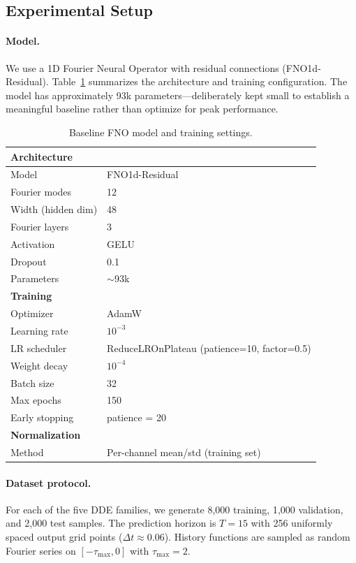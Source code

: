 
\subsection{Experimental Setup}

\paragraph{Model.}
We use a 1D Fourier Neural Operator with residual connections (FNO1d-Residual).
Table~\ref{tab:model-settings} summarizes the architecture and training configuration.
The model has approximately 93k parameters---deliberately kept small to establish a
meaningful baseline rather than optimize for peak performance.

\begin{table}[h]
\centering
\caption{Baseline FNO model and training settings.}
\label{tab:model-settings}
\begin{tabular}{ll}
\toprule
\textbf{Architecture} & \\
\midrule
Model & FNO1d-Residual \\
Fourier modes & 12 \\
Width (hidden dim) & 48 \\
Fourier layers & 3 \\
Activation & GELU \\
Dropout & 0.1 \\
Parameters & ${\sim}$93k \\
\midrule
\textbf{Training} & \\
\midrule
Optimizer & AdamW \\
Learning rate & $10^{-3}$ \\
LR scheduler & ReduceLROnPlateau (patience=10, factor=0.5) \\
Weight decay & $10^{-4}$ \\
Batch size & 32 \\
Max epochs & 150 \\
Early stopping & patience = 20 \\
\midrule
\textbf{Normalization} & \\
\midrule
Method & Per-channel mean/std (training set) \\
\bottomrule
\end{tabular}
\end{table}

\paragraph{Dataset protocol.}
For each of the five DDE families, we generate 8{,}000 training, 1{,}000 validation,
and 2{,}000 test samples.  The prediction horizon is $T = 15$ with 256 uniformly spaced
output grid points ($\Delta t \approx 0.06$).  History functions are sampled as random
Fourier series on $[-\tau_{\max}, 0]$ with $\tau_{\max} = 2$.

